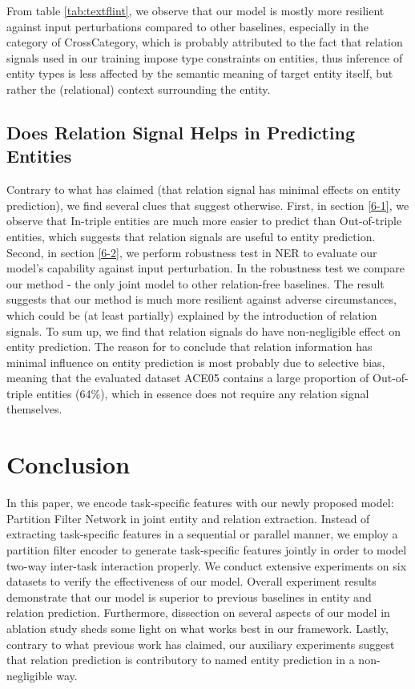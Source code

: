 \documentclass[11pt]{article}
\begin{document}
From table \ref{tab:textflint}, we observe that our model is mostly more resilient against input perturbations compared to other baselines, especially in the category of CrossCategory, which is probably attributed to the fact that relation signals used in our training impose type constraints on entities, thus inference of entity types is less affected by the semantic meaning of target entity itself, but rather the (relational) context surrounding the entity. 


\subsection{Does Relation Signal Helps in Predicting Entities}
Contrary to what \citep{zhong2021frustratingly} has claimed (that relation signal has minimal effects on entity prediction), we find several clues that suggest otherwise. First, in section \ref{6-1}, we observe that In-triple entities are much more easier to predict than Out-of-triple entities, which suggests that relation signals are useful to entity prediction. Second,
in section \ref{6-2}, we perform robustness test in NER to evaluate our model's capability against input perturbation. In the robustness test we compare our method - the only joint model to other relation-free baselines. The result suggests that our method is much more resilient against adverse circumstances, which could be (at least partially) explained by the introduction of relation signals.
To sum up, we find that relation signals do have non-negligible effect on entity prediction. The reason for \citep{zhong2021frustratingly} to conclude that relation information has minimal influence on entity prediction is most probably due to selective bias, meaning that the evaluated dataset ACE05 contains a large proportion of Out-of-triple entities (64\%), which in essence does not require any relation signal themselves.  


\section{Conclusion}
In this paper, we encode task-specific features with our newly proposed model: Partition Filter Network in joint entity and relation extraction. Instead of extracting task-specific features in a sequential or parallel manner, we employ a partition filter encoder to generate task-specific features jointly in order to model two-way inter-task interaction properly. We conduct extensive experiments on six datasets to verify the effectiveness of our model. Overall experiment results demonstrate that our model is superior to previous baselines in entity and relation prediction. Furthermore, dissection on several aspects of our model in ablation study sheds some light on what works best in our framework.  Lastly, contrary to what previous work has claimed, our auxiliary experiments suggest that relation prediction is contributory to named entity prediction in a non-negligible way.
\end{document}
